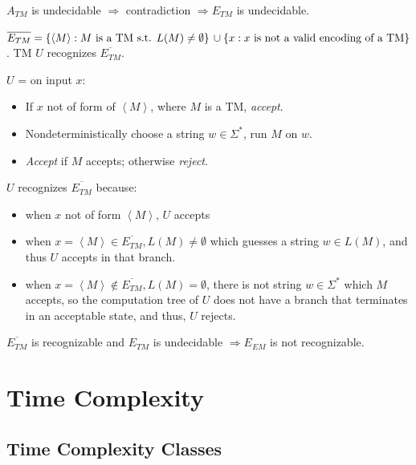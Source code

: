 \documentclass[10pt,landscape,a4paper]{article}
\newcommand{\set}[1]{\left \{ #1 \right \}}
\newcommand{\encoding}[1]{\left \langle #1 \right \rangle}
\begin{document}
\begin{multicols*}{3}
$A_{TM}$ is undecidable $\Rightarrow$ contradiction $\Rightarrow E_{TM}$ is undecidable.

$\overline{E_{TM}}= \set{\encoding{M}: M \text{ is a TM s.t. } L(M) \neq \emptyset} \\ \cup \set{x: x \text{ is not a valid encoding of a TM}}$. TM $U$ recognizes $\overline{E_{TM}}$.

$U$ = on input $x$:

\begin{itemize}
    \item If $x$ not of form of $\encoding{M}$, where $M$ is a TM, \emph{accept}.
    \item Nondeterministically choose a string $w \in \Sigma^*$, run $M$ on $w$.
    \item \emph{Accept} if $M$ accepts; otherwise \emph{reject}.
\end{itemize}

$U$ recognizes $\overline{E_{TM}}$ because:

\begin{itemize}
    \item when $x$ not of form $\encoding{M}$, $U$ accepts
    \item when $x = \encoding{M} \in \overline{E_{TM}}, L(M) \neq \emptyset$ which guesses a string $w \in L(M)$, and thus $U$ accepts in that branch.
    \item when $x = \encoding{M} \notin \overline{E_{TM}}, L(M) = \emptyset$, there is not string $w \in \Sigma^*$ which $M$ accepts, so the computation tree of $U$ does not have a branch that terminates in an acceptable state, and thus, $U$ rejects.
\end{itemize}

$\overline{E_{TM}}$ is recognizable and $E_{TM}$ is undecidable $\Rightarrow E_{EM}$ is not recognizable.

\section{Time Complexity}

\subsection{Time Complexity Classes}


\end{multicols*}
\end{document}
